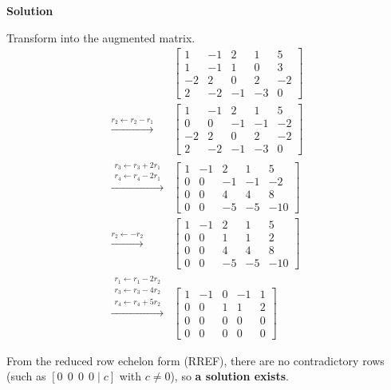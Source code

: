 \documentclass[12pt,a4paper]{article}
\begin{document}
\textbf{Solution}

Transform into the augmented matrix.
\begin{align*}
	&\begin{bmatrix}
		1 & -1 & 2 & 1 & 5 \\
		1 & -1 & 1 & 0 & 3 \\
		-2 & 2 & 0 & 2 & -2 \\
		2 & -2 & -1 & -3 & 0 
	\end{bmatrix} \\
	\overset{r_2 \leftarrow r_2 - r_1}{\longrightarrow} &\begin{bmatrix}
		1 & -1 & 2 & 1 & 5 \\
		0 & 0 & -1 & -1 & -2 \\
		-2 & 2 & 0 & 2 & -2 \\
		2 & -2 & -1 & -3 & 0 
	\end{bmatrix} \\
	\overset{\substack{r_3 \leftarrow r_3 + 2r_1 \\ r_4 \leftarrow r_4 - 2r_1}}{\longrightarrow} &\begin{bmatrix}
		1 & -1 & 2 & 1 & 5 \\
		0 & 0 & -1 & -1 & -2 \\
		0 & 0 & 4 & 4 & 8 \\
		0 & 0 & -5 & -5 & -10 
	\end{bmatrix} \\
	\overset{r_2 \leftarrow -r_2}{\longrightarrow} &\begin{bmatrix}
		1 & -1 & 2 & 1 & 5 \\
		0 & 0 & 1 & 1 & 2 \\
		0 & 0 & 4 & 4 & 8 \\
		0 & 0 & -5 & -5 & -10 
	\end{bmatrix} \\
	\overset{\substack{r_1 \leftarrow r_1 - 2r_2 \\ r_3 \leftarrow r_3 - 4r_2 \\ r_4 \leftarrow r_4 + 5r_2}}{\longrightarrow} &\begin{bmatrix}
		1 & -1 & 0 & -1 & 1 \\
		0 & 0 & 1 & 1 & 2 \\
		0 & 0 & 0 & 0 & 0 \\
		0 & 0 & 0 & 0 & 0 
	\end{bmatrix}
\end{align*}


From the reduced row echelon form (RREF), there are no contradictory rows (such as $[0 \ \ 0 \ \ 0 \ \ 0 \mid c]$ with $c \neq 0$), so \textbf{a solution exists}. 
\end{document}

